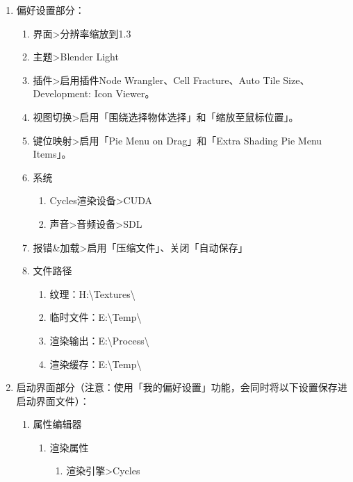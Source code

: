 \documentclass{../../PublicResources/DocClass}
\begin{document}
    \newpage
    \par
    \begin{enumerate}
        \item 偏好设置部分：
        \begin{enumerate}
            \item 界面>分辨率缩放到1.3
            \item 主题>Blender Light
            \item 插件>启用插件Node Wrangler、Cell Fracture、Auto Tile Size、Development: Icon Viewer。
            \item 视图切换>启用「围绕选择物体选择」和「缩放至鼠标位置」。
            \item 键位映射>启用「Pie Menu on Drag」和「Extra Shading Pie Menu Items」。
            \item 系统
            \begin{enumerate}
                \item Cycles渲染设备>CUDA
                \item 声音>音频设备>SDL
            \end{enumerate}
            \item 报错\&加载>启用「压缩文件」、关闭「自动保存」
            \item 文件路径
            \begin{enumerate}
                \item 纹理：H:\textbackslash Textures\textbackslash
                \item 临时文件：E:\textbackslash Temp\textbackslash
                \item 渲染输出：E:\textbackslash Process\textbackslash
                \item 渲染缓存：E:\textbackslash Temp\textbackslash
            \end{enumerate}
        \end{enumerate}
        \item 启动界面部分（注意：使用「我的偏好设置」功能，会同时将以下设置保存进启动界面文件）：
        \begin{enumerate}
            \item 属性编辑器
            \begin{enumerate}
                \item 渲染属性
                \begin{enumerate}
                    \item 渲染引擎>Cycles

\end{enumerate}
\end{enumerate}
\end{enumerate}
\end{enumerate}
\end{document}

